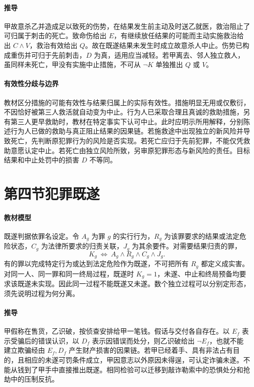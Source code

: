 \paragraph{推导}
甲故意杀乙并造成足以致死的伤势，在结果发生前主动及时送乙就医，救治阻止了可归属于刺击的死亡。致命伤给出 \(E\)，有继续放任结果的可能而主动实施救治给出 \(C\land V\)，救治有效给出 \(Q\)。故在既遂结果未发生时成立故意杀人中止。伤势已构成重伤并可归于先前刺击，\(D\) 为真，适用应当减轻。若甲离去、邻人独立救人，虽同样未死亡，甲没有实施中止措施，不可从 \(\neg K\) 单独推出 \(Q\) 或 \(V\)。

\paragraph{有效性分歧与边界}
教材区分措施的可能有效性与结果归属上的实际有效性。措施明显无用或仅敷衍，不因恰好被第三人救活就自动变为中止。行为人已采取合理且真诚的救助措施，另有第三人更早救助时，教材在特定事实下认可中止。此时应明示所用解释，分别陈述行为人已做的救助与真正阻止结果的因果链。若施救途中出现独立的新风险并导致死亡，先判断原犯罪行为的风险是否实现。若死亡应归于先前犯罪，不能仅凭救助意愿认定中止。若死亡由独立风险所致，另审原犯罪形态与新风险的责任。目标结果和中止处罚中的损害 \(D\) 不等同。

\section{第四节\quad 犯罪既遂}

\paragraph{教材模型}
既遂判据依罪名设定。令 \(A_g\) 为罪 \(g\) 的实行行为，\(R_g\) 为该罪要求的结果或法定危险状态，\(C_g\) 为法律所要求的归责关联，\(J_g\) 为其余要件。对需要结果归责的罪，
\[
K_g\ \Longleftrightarrow\ A_g\land R_g\land C_g\land J_g.
\]
有的罪以完成特定行为或达到法定危险作为既遂，不可把所有 \(R_g\) 都定义成实害。对同一人、同一罪和同一终局过程，既遂时 \(K_g=1\)，未遂、中止和终局预备均要求该既遂未实现。因此同一过程不能既遂又未遂。数个独立过程可以分别定形态，须先说明过程为何分离。

\paragraph{推导}
甲假称在售货，乙识破，按侦查安排给甲一笔钱。假话与交付各自存在。以 \(E_f\) 表示受骗后的错误认识，以 \(D_f\) 表示因错误而处分，则乙识破给出 \(\neg E_f\)，也就不能建立欺骗经由 \(E_f,D_f\) 产生财产损害的因果链。若甲已经着手、具有非法占有目的，且相应的未遂可罚条件成立，甲因意志以外原因未得逞，可认定诈骗未遂。不能从钱到了甲手中直接推出既遂。相同检验可以迁移到敲诈勒索中的恐惧处分和抢劫中的压制反抗。

